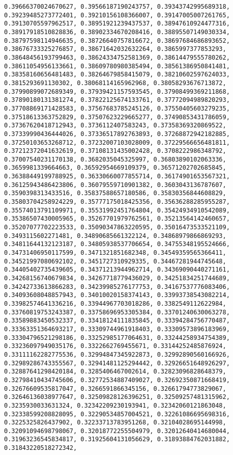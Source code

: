 \documentclass[11pt]{article}
\begin{document}
\begin{Verbatim}[commandchars=\\\{\}]
0.39666370024670627, 0.39566187190243757, 0.39343742995689318, 0.39239485273772401, 0.39210156108366007, 0.39147005007261765, 0.39130705597962517, 0.38951921239437537, 0.38947610924477316, 0.38917918510828836, 0.38902334670208416, 0.38895507149030334, 0.38797598114946635, 0.38726640757816672, 0.38697684686893652, 0.38676733325276857, 0.38671642032632264, 0.3865997377853293, 0.38648456193799463, 0.38624334752581369, 0.38614479555780262, 0.38611054956133661, 0.38609780980385494, 0.38561386950841481, 0.38358160656481483, 0.38264679858415079, 0.38210602597624033, 0.3815293691130302, 0.38068114165962968, 0.38058293676713872, 0.37990899072689349, 0.37939421157593545, 0.37908499369211868, 0.37890180131381274, 0.37822125674133761, 0.37772094989820293, 0.37708869171428583, 0.37567683785245126, 0.37550405603279235, 0.37518613363752829, 0.37507623229665277, 0.37490853431786059, 0.37367620418712943, 0.3736112407583243, 0.37358369320869522, 0.37339990436444026, 0.37336517892763893, 0.37268872942182885, 0.37250103653268712, 0.37232007103028009, 0.37229566656481811, 0.37212372041632619, 0.37108131435002428, 0.3708222986348792, 0.37007540231170138, 0.3682035045325997, 0.36803890102063336, 0.3659981339664663, 0.36592954669109379, 0.36571202702685845, 0.36388449199788925, 0.36330660077855714, 0.36174901653567321, 0.36125943486423806, 0.36079559710901382, 0.3603043136787607, 0.3590398313433516, 0.35837588657180586, 0.35830356844608829, 0.35803704258924229, 0.35777175018425356, 0.35636288285955287, 0.35574013791109971, 0.35531992451764804, 0.35424934910542089, 0.35386507430005965, 0.35267701979762561, 0.35213564142460657, 0.35207077702223533, 0.35090347863220595, 0.35016473533521109, 0.3493115602271481, 0.34890685661322124, 0.34868979866869293, 0.34811644132123187, 0.34805938537706654, 0.34755348195524666, 0.34731406950117599, 0.3471321851682348, 0.34549359565366411, 0.34521997080692102, 0.3451727310929335, 0.34467281944745648, 0.34405402735439605, 0.34371213944962714, 0.34369090440271161, 0.34268156740679834, 0.34267718779436029, 0.34251834251744689, 0.34242733613866283, 0.34239985276177753, 0.34167537776083406, 0.34093608048857943, 0.34010020158374143, 0.33993738543082214, 0.33982574641336216, 0.33944967703018286, 0.3382549112622984, 0.33760819753243387, 0.33758696953305384, 0.33701240630063278, 0.33589883450532337, 0.33418124111835845, 0.33394284756770487, 0.33363351364693217, 0.33309744961918403, 0.33309573896183969, 0.33304796521298186, 0.33252985177064631, 0.33244258934754389, 0.33236097949035176, 0.3322662769455671, 0.33144252485876924, 0.33111162282775536, 0.32994847345922873, 0.32992890560166926, 0.32989286743355567, 0.32941481125294442, 0.32926651648926297, 0.32887641298420184, 0.3285406467002614, 0.32823096828648379, 0.32798410434745606, 0.32772534887409027, 0.32692350871668419, 0.32676609535817047, 0.3266591866345156, 0.32661794773829067, 0.32646136038977647, 0.32509828126396251, 0.32509257481315962, 0.3235930033631324, 0.32342209230193941, 0.32342060121863048, 0.32338599208828095, 0.32290534857004521, 0.32261086695698316, 0.3225325826437902, 0.32233713783951268, 0.32104028695144998, 0.32091094698798067, 0.32018772255504979, 0.32012640414680044, 0.31963236545834817, 0.31925604131056629, 0.31893884762031882, 0.31843220518272342, 
\end{Verbatim}
\end{document}
